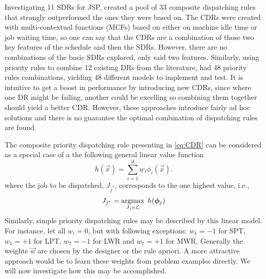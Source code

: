 \documentclass[smallextended]{svjour3}
\begin{document}


Investigating 11 SDRs for JSP, \cite{Lu13} created a pool of 33 composite 
dispatching rules that strongly outperformed the ones they were based on. 
The CDRs were created with multi-contextual functions (MCFs) 
based on either on machine idle time or job waiting time, so one can say that 
the CDRs are a combination of those two key features of the schedule and then 
the SDRs. However, there are no combinations of the basic SDRs explored, only 
said two features.  
Similarly, using priority rules to combine 12 existing DRs from the literature, 
\cite{Yu13} had 48 priority rules combinations, yielding 48 different models 
to implement and test. 
It is intuitive to get a boost in performance by introducing new CDRs, since 
where one DR might be failing, another could be excelling so combining them 
together should yield a better CDR. However, these approaches introduce fairly 
ad hoc solutions and there is no guarantee the optimal combination of 
dispatching rules are found.


The composite priority dispatching rule presenting in \eqref{eq:CDR} can be considered as a special case of a the following general linear value function
\begin{equation}\label{eq:jssp:linweights}
	h(\vec{x})=\sum_{i=1}^d w_i\phi_i(\vec{x}).
\end{equation}
where the job to be dispatched, 
$J_{j^*}$, corresponds to the one highest value, i.e.,
\begin{equation}\label{eq:lin}
	J_{j^*}=\mathop{\rm argmax}_{J_j\in \mathcal{L}}\; h(\bm{\phi}_j)
\end{equation}
Similarly, simple priority dispatching rules may be described by this linear model. For instance, let all $w_i=0$, but with following exceptions: $w_1=-1$ for SPT, $w_1=+1$ for LPT, $w_7=-1$ for LWR and $w_7=+1$ for MWR. Generally the weights $\vec{w}$ are chosen by the designer or the 
rule apriori.  A more attractive approach would be to learn these weights from 
problem examples directly. We will now investigate how this may be accomplished.
\end{document}
